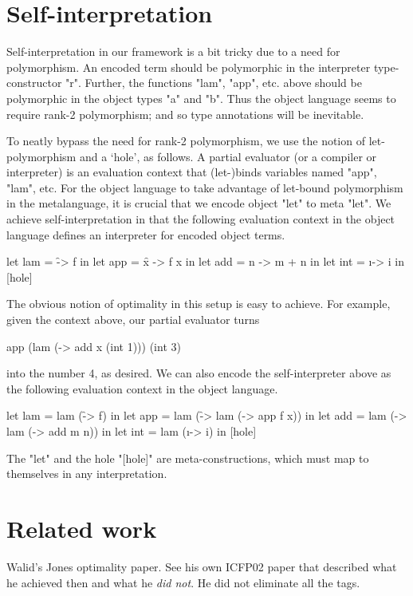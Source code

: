\documentclass[preprint]{sigplanconf}
\begin{document}
\section{Self-interpretation}


Self-interpretation in our framework is
a bit tricky due to a need for polymorphism.  An encoded term should
be polymorphic in the interpreter type-constructor "r".  Further, the
functions "lam", "app", etc. above should be polymorphic in the object
types "a" and "b".  Thus the object language seems to require rank-2
polymorphism; and so type annotations will be inevitable.

To neatly bypass the need for rank-2 polymorphism, we use the notion
of let-polymorphism and a `hole', as follows.  A partial evaluator (or
a compiler or interpreter) is an evaluation context that (let-)binds
variables named "app", "lam", etc.  For the object language to
take advantage of let-bound polymorphism in the metalanguage, it
is crucial that we encode object "let" to meta "let".  We achieve
self-interpretation in that the following evaluation context in the
object language defines an interpreter for encoded object terms.
\begin{code}
    let lam = \f -> f in
    let app = \f x -> f x in
    let add = \m n -> m + n in
    let int = \i -> i in
    [hole]
\end{code}
The obvious notion of optimality in this setup is easy to achieve.  For
example, given the context above, our partial evaluator turns
\begin{code}
    app (lam (\x -> add x (int 1))) (int 3)
\end{code}
into the number 4, as desired.  We can also encode the self-interpreter
above as the following evaluation context in the object language.
\begin{code}
    let lam = lam (\f -> f) in
    let app = lam (\f -> lam (\x -> app f x)) in
    let add = lam (\m -> lam (\n -> add m n)) in
    let int = lam (\i -> i) in
    [hole]
\end{code}
The "let" and the hole "[hole]" are meta-constructions, which must map to
themselves in any interpretation.  


\section{Related work}
Walid's Jones optimality paper. See his own ICFP02 paper that
described what he achieved then and what he \emph{did not}. He did not
eliminate all the tags.
\end{document}
